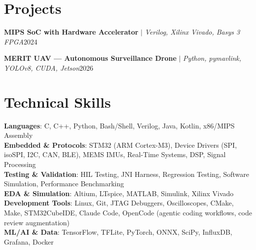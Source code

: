 \documentclass[letterpaper,11pt]{article}
\begin{document}
\section{Projects}
    \resumeSubHeadingListStart
 
      \resumeProjectHeading
          {\textbf{MIPS SoC with Hardware Accelerator} $|$ \emph{Verilog, Xilinx Vivado, Basys 3 FPGA}}{2024}
          \resumeItemListStart
            
          \resumeItemListEnd
 
      \resumeProjectHeading
          {\textbf{MERIT UAV --- Autonomous Surveillance Drone} $|$ \emph{Python, pymavlink, YOLOv8, CUDA, Jetson}}{2026}
          \resumeItemListStart

            
          \resumeItemListEnd 
 
    \resumeSubHeadingListEnd
 
\section{Technical Skills}
 \resumeSubHeadingListStart
    \small{\item{
     \textbf{Languages}{: C, C++, Python, Bash/Shell, Verilog, Java, Kotlin, x86/MIPS Assembly} \\
     \textbf{Embedded \& Protocols}{: STM32 (ARM Cortex-M3), Device Drivers (SPI, isoSPI, I2C, CAN, BLE), MEMS IMUs, Real-Time Systems, DSP, Signal Processing} \\
     \textbf{Testing \& Validation}{: HIL Testing, JNI Harness, Regression Testing, Software Simulation, Performance Benchmarking} \\
     \textbf{EDA \& Simulation}{: Altium, LTspice, MATLAB, Simulink, Xilinx Vivado} \\
     \textbf{Development Tools}{: Linux, Git, JTAG Debuggers, Oscilloscopes, CMake, Make, STM32CubeIDE, Claude Code, OpenCode (agentic coding workflows, code review augmentation)} \\
     \textbf{ML/AI \& Data}{: TensorFlow, TFLite, PyTorch, ONNX, SciPy, InfluxDB, Grafana, Docker}
    }}
 \resumeSubHeadingListEnd
 
\end{document}
